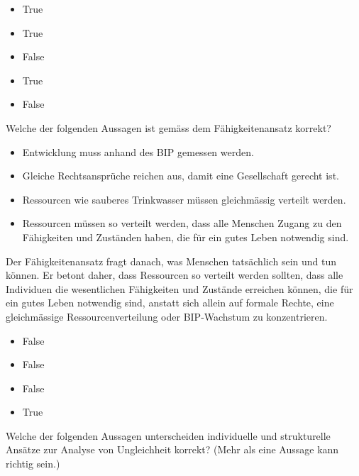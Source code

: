 \documentclass[
  nswissgerman,
  a4paper,
  DIV=11,
  numbers=noendperiod,
  oneside,
  openany]{scrreprt}
\providecommand{\tightlist}{%
  \setlength{\itemsep}{0pt}\setlength{\parskip}{0pt}}
\begin{document}
\begin{itemize}
\tightlist
\item
  True
\item
  True
\item
  False
\item
  True
\item
  False
\end{itemize}

Welche der folgenden Aussagen ist gemäss dem Fähigkeitenansatz korrekt?

\begin{itemize}
\tightlist
\item[$\square$]
  Entwicklung muss anhand des BIP gemessen werden.
\item[$\square$]
  Gleiche Rechtsansprüche reichen aus, damit eine Gesellschaft gerecht
  ist.
\item[$\square$]
  Ressourcen wie sauberes Trinkwasser müssen gleichmässig verteilt
  werden.
\item[$\square$]
  Ressourcen müssen so verteilt werden, dass alle Menschen Zugang zu den
  Fähigkeiten und Zuständen haben, die für ein gutes Leben notwendig
  sind.
\end{itemize}

Der Fähigkeitenansatz fragt danach, was Menschen tatsächlich sein und
tun können. Er betont daher, dass Ressourcen so verteilt werden sollten,
dass alle Individuen die wesentlichen Fähigkeiten und Zustände erreichen
können, die für ein gutes Leben notwendig sind, anstatt sich allein auf
formale Rechte, eine gleichmässige Ressourcenverteilung oder
BIP-Wachstum zu konzentrieren.

\begin{itemize}
\tightlist
\item
  False
\item
  False
\item
  False
\item
  True
\end{itemize}

Welche der folgenden Aussagen unterscheiden individuelle und
strukturelle Ansätze zur Analyse von Ungleichheit korrekt? (Mehr als
eine Aussage kann richtig sein.)
\end{document}
